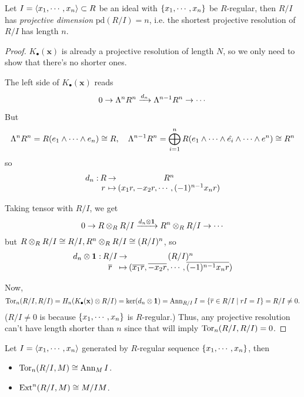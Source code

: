 \begin{coro}
  Let $I = \langle x_1, \cdots, x_n\rangle \subset R$ be an ideal with $\lbrace x_1, \cdots, x_n\rbrace$ be $R$-regular, 
  then $R/I$ has {\it projective dimension} $\mathrm{pd}(R/I) = n$, 
  i.e. the shortest projective resolution of $R/I$ has length $n$.

  \begin{proof}
    $K_\bullet(\mathbf{x})$ is already a projective resolution of length $N$, so 
    we only need to show that there's no shorter ones.

    The left side of $K_\bullet(\mathbf{x})$ reads
    $$
    0 \to \Lambda^n R^n \xrightarrow{d_n} \Lambda^{n-1} R^n \to \cdots
    $$

    But 
    $$
    \Lambda^n R^n = R(e_1 \wedge \cdots \wedge e_n) \cong R, \quad
    \Lambda^{n-1} R^n = \bigoplus\limits_{i=1}^n  R (e_1 \wedge \cdots \wedge \hat{e_i} \wedge \cdots \wedge e^n)
    \cong R^n
    $$
    so
    $$
    \deffunc{d_n}{R}{R^n}{r}{(x_1 r, -x_2 r, \cdots, (-1)^{n-1} x_n r)}
    $$

    Taking tensor with $R/I$, we get
    $$
    0 \to R \otimes_R R/I \xrightarrow{d_n \otimes \mathbf{1}} R^n \otimes_R R/I \to \cdots
    $$
    but $R \otimes_R R/I \cong R/I, R^n \otimes_R R/I \cong (R/I)^n$, so
    $$
    \deffunc{d_n \Ot \id}{R/I}{(R/I)^n}{\ob{r}}{(\ob{x_1r}, \ob{-x_2r}, \cdots, \ob{(-1)^{n-1}x_n r})}
    $$

    Now, 
    $$
    \operatorname{Tor}_n(R/I, R/I) = H_n(K_\bullet(\mathbf{x}) \otimes R/I) = \ker (d_n \otimes \mathbf{1})
    = \operatorname{Ann}_{R/I} I = \lbrace\overline{r} \in R/I \mid rI = I\rbrace = R/I \neq 0.
    $$
    ($R/I \neq 0$ is because $\lbrace x_1, \cdots, x_n\rbrace$ is $R$-regular.)
    Thus, any projective resolution can't have length
    shorter than $n$ since that will imply $\operatorname{Tor}_n(R/I, R/I) = 0$.
  \end{proof}
\end{coro}

\begin{remark}
  Let $I = \langle x_1, \cdots, x_n\rangle$ generated by $R$-regular sequence 
  $\lbrace x_1, \cdots, x_n\rbrace$, then
  \begin{itemize}
    \item $\operatorname{Tor}_n(R/I, M) \cong \operatorname{Ann}_M I$.
    \item $\operatorname{Ext}^n(R/I, M) \cong M/IM$.
  \end{itemize}
\end{remark}

